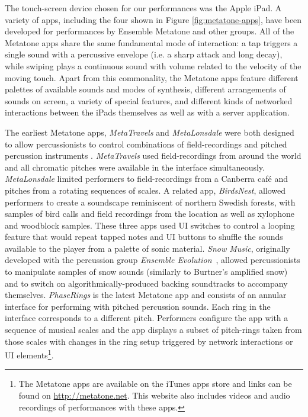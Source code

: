 \documentclass[graybox]{svmult}
\begin{document}
The touch-screen device chosen for our performances was the Apple
iPad. A variety of apps, including the four shown in Figure
\ref{fig:metatone-apps}, have been developed for performances
by Ensemble Metatone and other groups. All of the Metatone apps
share the same fundamental mode of interaction: a tap triggers a
single sound with a percussive envelope (i.e. a sharp attack and long
decay), while swiping plays a continuous sound with volume related to
the velocity of the moving touch. Apart from this commonality, the
Metatone apps feature different palettes of available sounds and modes
of synthesis, different arrangements of sounds on screen, a variety of
special features, and different kinds of networked interactions
between the iPads themselves as well as with a server application.

The earliest Metatone apps, \emph{MetaTravels} and \emph{MetaLonsdale}
were both designed to allow percussionists to control combinations of
field-recordings and pitched percussion
instruments \citep{Martin:2014xp}. \emph{MetaTravels} used
field-recordings from around the world and all chromatic pitches were
available in the interface simultaneously. \emph{MetaLonsdale} limited
performers to field-recordings from a Canberra caf\'e and pitches from
a rotating sequences of scales. A related app, \emph{BirdsNest},
allowed performers to create a soundscape reminiscent of northern
Swedish forests, with samples of bird calls and field recordings from
the location as well as xylophone and woodblock samples. These three
apps used UI switches to control a looping feature that would repeat
tapped notes and UI buttons to shuffle the sounds available to the
player from a palette of sonic material. \emph{Snow Music}, originally developed with the
percussion group \emph{Ensemble Evolution}~\citep{Martin:2012fk},
 allowed
percussionists to manipulate samples of snow sounds (similarly to
Burtner's amplified snow) and to switch on algorithmically-produced backing
soundtracks to accompany themselves. 
\emph{PhaseRings} is the latest
Metatone app and consists of an annular interface for performing with
pitched percussion sounds. Each ring in the interface corresponds to a
different pitch. Performers configure the app with a sequence of
musical scales and the app displays a subset of pitch-rings taken from
those scales with changes in the ring setup triggered by network
interactions or UI elements\footnote{The Metatone apps are available
  on the iTunes apps store and links can be found on
  \url{http://metatone.net}. This website also includes videos and
  audio recordings of performances with these apps.}.
\end{document}
